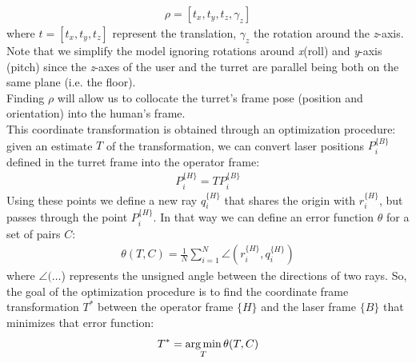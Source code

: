 \begin{align}
	\rho = [t_x, t_y, t_z, \gamma_z] \nonumber
\end{align}
where $t=[t_x, t_y, t_z]$ represent the translation, $\gamma_z$ the rotation around the \emph{z}-axis. Note that we simplify the model ignoring rotations around \emph{x}(roll) and \emph{y}-axis (pitch)  since the \emph{z}-axes of the user and the turret are parallel being both on the same plane (i.e. the floor).\\ Finding $\rho$ will allow us to collocate the turret's frame pose (position and orientation) into the human's frame.\\
This coordinate transformation is obtained through an optimization procedure: given an estimate $T$ of the transformation, we can convert laser positions $P_i^{\{B\}}$ defined in the turret frame into the operator frame:
\begin{align}
	P_i^{\{H\}}= TP_i^{\{B\}} \nonumber
\end{align}
Using these points we define a new ray $q_i^{\{H\}}$ that shares the origin with $r_i^{\{H\}}$, but passes through the point $P_i^{\{H\}}$. In that way we can define an error function $\theta$ for a set of pairs $C$:
\begin{align}\label{eq:error}
	\theta(T,C)=\frac{1}{N}\sum_{i=1}^N\angle(r_i^{\{H\}},q_i^{\{H\}})
\end{align}
where $\angle(\dots$) represents the unsigned angle between the directions of two rays. So, the goal of the optimization procedure is to find the coordinate frame transformation $T^*$ between the operator frame $\{H\}$ and the laser frame $\{B\}$ that minimizes that error function:
\begin{align}
	T^*=\operatorname*{arg\,min}_T\theta(T,C)
\end{align}